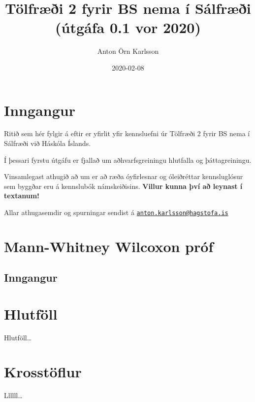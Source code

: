 \documentclass[]{book}
\title{Tölfræði 2 fyrir BS nema í Sálfræði (útgáfa 0.1 vor 2020)}
\author{Anton Örn Karlsson}
\date{2020-02-08}
\begin{document}
\maketitle

{
\setcounter{tocdepth}{1}
\tableofcontents
}
\hypertarget{inngangur}{%
\chapter{Inngangur}\label{inngangur}}

Ritið sem hér fylgir á eftir er yfirlit yfir kennsluefni úr Tölfræði 2 fyrir BS nema í Sálfræði við Háskóla Íslands.

Í þessari fyrstu útgáfu er fjallað um aðhvarfsgreiningu hlutfalla og þáttagreiningu.

Vinsamlegast athugið að um er að ræða óyfirlesnar og óleiðréttar kennsluglósur sem byggðar eru á kennslubók námskeiðisins. \textbf{Villur kunna því að leynast í textanum!}

Allar athugasemdir og spurningar sendist á \href{mailto:anton.karlsson@hagstofa.is}{\nolinkurl{anton.karlsson@hagstofa.is}}

\hypertarget{mann-whitney-wilcoxon-pruxf3f}{%
\chapter{Mann-Whitney Wilcoxon próf}\label{mann-whitney-wilcoxon-pruxf3f}}

\hypertarget{logreg-inngangur}{%
\section{Inngangur}\label{logreg-inngangur}}

\hypertarget{hlutfuxf6ll}{%
\chapter{Hlutföll}\label{hlutfuxf6ll}}

Hlutföll\ldots{}

\hypertarget{krosstuxf6flur}{%
\chapter{Krosstöflur}\label{krosstuxf6flur}}

Llllll\ldots{}


\end{document}
